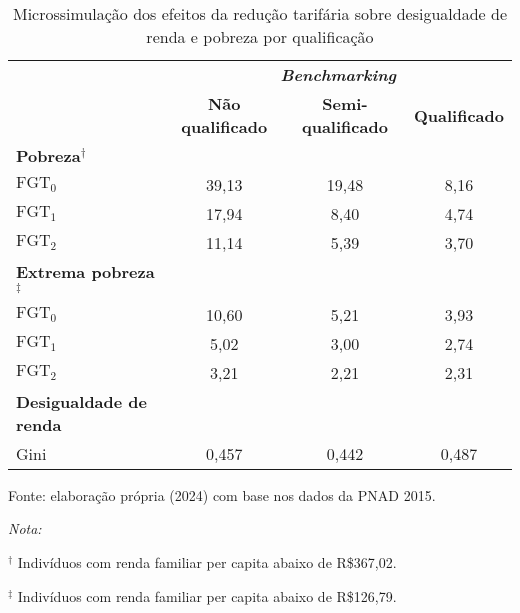 \begin{apendicesenv}
	  \newpage


	  \begin{table}[h]
		\centering
		\small
		\begin{threeparttable}
			\caption{Microssimulação dos efeitos da redução tarifária sobre desigualdade de renda e pobreza por qualificação} \label{tab:result_microssimulacao}
			\begin{tabular}{lccc}
				\hline
				\multirow{2}{*}{\textbf{}} & \multicolumn{3}{c}{\textit{\textbf{Benchmarking}}} \\ \cline{2-4} 
				 & \textbf{Não qualificado} & \textbf{Semi-qualificado} & \textbf{Qualificado} \\ \hline
				\textbf{Pobreza$^{\dag}$} &  &  &  \\
				\hspace{0.2cm} $\text{FGT}_0$ & 39,13 & 19,48 & 8,16 \\
				\hspace{0.2cm} $\text{FGT}_1$ & 17,94 & 8,40 & 4,74 \\
				\hspace{0.2cm} $\text{FGT}_2$ & 11,14 & 5,39 & 3,70 \\ \hline
				\textbf{Extrema pobreza$^{\ddagger}$} &  &  &  \\
				\hspace{0.2cm} $\text{FGT}_0$ & 10,60 & 5,21 & 3,93 \\
				\hspace{0.2cm} $\text{FGT}_1$ & 5,02 & 3,00 & 2,74 \\
				\hspace{0.2cm} $\text{FGT}_2$ & 3,21 & 2,21 & 2,31 \\ \hline
				\textbf{Desigualdade de renda} &  &  &  \\
				\hspace{0.2cm} Gini & 0,457 & 0,442 & 0,487 \\ \hline
				\end{tabular}
		\begin{tablenotes}
			\footnotesize
			\item Fonte: elaboração própria (2024) com base nos dados da PNAD 2015.
			\item \textit{Nota:}
			\item \hspace{0.2cm} $^{\dag}$     Indivíduos com renda familiar per capita abaixo de R\$367,02.
			\item \hspace{0.2cm} $^{\ddagger}$ Indivíduos com renda familiar per capita abaixo de R\$126,79.
		\end{tablenotes}
		\end{threeparttable}
	\end{table}


\end{apendicesenv}
